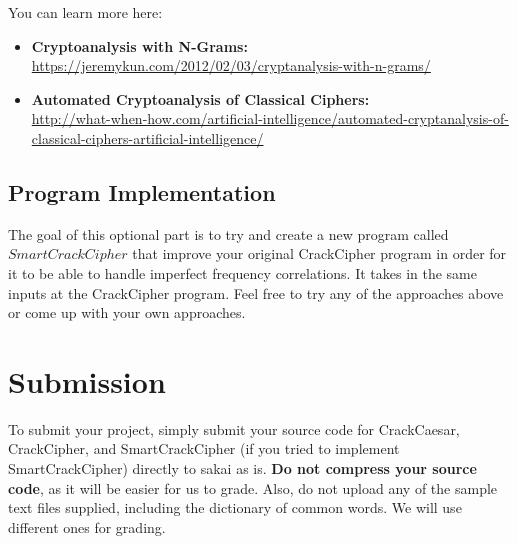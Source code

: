 \documentclass{article}
\begin{document}
\noindent You can learn more here:
\begin{itemize}
\item \textbf{Cryptoanalysis with N-Grams:}\\ \url{https://jeremykun.com/2012/02/03/cryptanalysis-with-n-grams/}
\item \textbf{Automated Cryptoanalysis of Classical Ciphers:}\\ \url{http://what-when-how.com/artificial-intelligence/automated-cryptanalysis-of-classical-ciphers-artificial-intelligence/}
\end{itemize}

\subsection{Program Implementation}
The goal of this optional part is to try and create a new program called $SmartCrackCipher$ that improve your original CrackCipher program in order for it to be able to handle imperfect frequency correlations. It takes in the same inputs at the CrackCipher program. Feel free to try any of the approaches above or come up with your own approaches.

\section{Submission}
To submit your project, simply submit your source code for CrackCaesar, CrackCipher, and SmartCrackCipher (if you tried to implement SmartCrackCipher) directly to sakai as is. \textbf{Do not compress your source code}, as it will be easier for us to grade. Also, do not upload any of the sample text files supplied, including the dictionary of common words. We will use different ones for grading.
\end{document}
